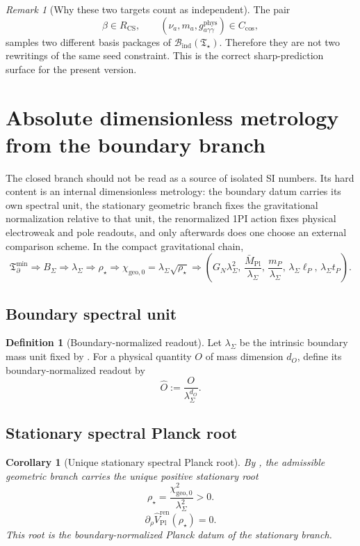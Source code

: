 \documentclass[11pt,a4paper]{article}
\newtheorem{corollary}[theorem]{Corollary}
\theoremstyle{definition}
\newtheorem{definition}[theorem]{Definition}
\theoremstyle{remark}
\newtheorem*{remark}{Remark}
\newcommand{\Mpl}{\bar M_{\mathrm{Pl}}}
\newcommand{\Tbound}{\mathfrak T_{\partial}^{\min}}
\newcommand{\chigeozero}{\chi_{\mathrm{geo},0}}
\newcommand{\Tstar}{\mathfrak T_{\star}}
\newcommand{\Bind}{\mathcal B_{\mathrm{ind}}}
\begin{document}
\begin{remark}[Why these two targets count as independent]
The pair
\[
\beta\in R_{\mathrm{CS}},
\qquad
(\nu_a,m_a,g_{a\gamma\gamma}^{\mathrm{phys}})\in C_{\mathrm{cos}},
\]
samples two different basis packages of $\Bind(\Tstar)$. Therefore they are not two rewritings of
the same seed constraint. This is the correct sharp-prediction surface for the present version.
\end{remark}

\section{Absolute dimensionless metrology from the boundary branch}
\label{sec:absolute-dimensionless-metrology}

The closed branch should not be read as a source of isolated SI numbers. Its hard content is an
internal dimensionless metrology: the boundary datum carries its own spectral unit, the stationary
geometric branch fixes the gravitational normalization relative to that unit, the renormalized 1PI
action fixes physical electroweak and pole readouts, and only afterwards does one choose an
external comparison scheme.
In the compact gravitational chain,
\[
\Tbound
\Rightarrow
B_\Sigma
\Rightarrow
\lambda_\Sigma
\Rightarrow
\rho_\star
\Rightarrow
\chigeozero=\lambda_\Sigma\sqrt{\rho_\star}
\Rightarrow
\left(
G_N\lambda_\Sigma^2,\,
\frac{\Mpl}{\lambda_\Sigma},\,
\frac{m_P}{\lambda_\Sigma},\,
\lambda_\Sigma\ell_P,\,
\lambda_\Sigma t_P
\right).
\]

\subsection{Boundary spectral unit}

\begin{definition}[Boundary-normalized readout]
\label{def:boundary-spectral-unit}
Let $\lambda_\Sigma$ be the intrinsic boundary mass unit fixed by
. For a physical quantity $O$ of mass dimension $d_O$,
define its boundary-normalized readout by
\[
\widehat O:=\frac{O}{\lambda_\Sigma^{d_O}}.
\]
\end{definition}

\subsection{Stationary spectral Planck root}

\begin{corollary}[Unique stationary spectral Planck root]
\label{thm:unique-stationary-spectral-planck-root}
By , the admissible geometric branch carries the unique
positive stationary root
\[
\rho_\star=\frac{\chigeozero^2}{\lambda_\Sigma^2}>0.
\]
\[
\partial_\rho\widehat V_{\mathrm{Pl}}^{\mathrm{ren}}(\rho_\star)=0.
\]
This root is the boundary-normalized Planck datum of the stationary branch.
\end{corollary}
\end{document}
